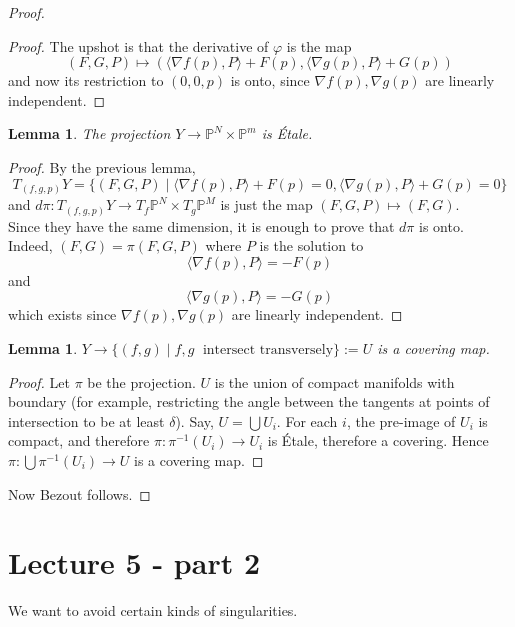 \documentclass[12pt]{article}
\newtheorem{lemma}[theorem]{Lemma}
\theoremstyle{remark}
\newcommand{\Pp}{\mathbb{P}}
\begin{document}
\begin{proof}
\begin{proof}
The upshot is that the derivative of $\varphi$ is the map 
$$(F,G,P) \mapsto (\langle \nabla f(p), P \rangle + F(p), \langle \nabla g(p), P \rangle + G(p)) $$
and now its restriction to $(0,0,p)$ is onto, since $\nabla f(p), \nabla g(p)$ are linearly independent.
\end{proof}

\begin{lemma}
The projection $Y \rightarrow \Pp^N \times \Pp^m$ is \'{E}tale.
\end{lemma}

\begin{proof}
By the previous lemma, 
$$T_{(f,g,p)}Y =  \{ (F,G,P) \; | \; \langle \nabla f(p), P \rangle +F(p) = 0  ,  \langle \nabla g(p), P \rangle +G(p) = 0  \}$$ and $d\pi: T_{(f,g,p)}Y \rightarrow T_f\Pp^N \times T_g \Pp^M $ is just the map $(F,G,P) \mapsto (F,G)$.\\

Since they have the same dimension, it is enough to prove that $d \pi$ is onto. Indeed, $(F,G) = \pi(F,G,P)$ where $P$ is the solution to $$\langle \nabla f(p) , P \rangle = -F(p) $$ and $$\langle \nabla g(p) , P \rangle = -G(p) $$
which exists since $\nabla f(p), \nabla g(p)$ are linearly independent.

\end{proof}

\begin{lemma}
$Y \rightarrow \{(f,g) \; | \; f,g \;\text{ intersect transversely}  \} := U $ is a covering map.
\end{lemma}

\begin{proof}
Let $\pi$ be the projection. $U$ is the union of compact manifolds with boundary (for example, restricting the angle between the tangents at points of intersection to be at least $\delta$). Say, $U = \bigcup U_i$. For each $i$, the pre-image of $U_i$ is compact, and therefore $\pi: \pi^{-1}(U_i) \rightarrow U_i$ is \'{E}tale, therefore a covering. Hence $\pi: \bigcup \pi^{-1}(U_i) \rightarrow U$ is a covering map.
\end{proof}

Now Bezout follows.

\end{proof}

\section{Lecture 5 - part 2}

We want to avoid certain kinds of singularities. 
\end{document}
